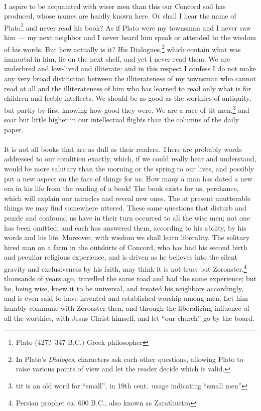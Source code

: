 \documentclass[letterpaper,12pt]{article}
\begin{document}
\paragraph{}
I aspire to be acquainted with wiser men than this our Concord soil has
produced, whose names are hardly known here. Or shall I hear the name of
Plato\footnote{Plato (427?--347 B.C.) Greek philosopher} and never read his
book? As if Plato were my townsman and I never saw him --- my next neighbor and
I never heard him speak or attended to the wisdom of his words. But how actually
is it? His Dialogues,\footnote{In Plato's \textit{Dialoges}, characters ask each
    other questions, allowing Plato to raise various points of view and let the
    reader decide which is valid.} which contain what was immortal in him, lie
on the next shelf, and yet I never read them. We are underbred and low-lived and
illiterate; and in this respect I confess I do not make any very broad
distinction between the illiterateness of my townsman who cannot read at all and
the illiterateness of him who has learned to read only what is for children and
feeble intellects. We should be as good as the worthies of antiquity, but partly
by first knowing how good they were. We are a race of tit-men,\footnote{tit is
    an old word for \enquote{small}, in 19th cent.\ usage indicating
    \enquote{small men}} and soar but little higher in our intellectual flights
than the columns of the daily paper.

\paragraph{}
It is not all books that are as dull as their readers. There are probably words
addressed to our condition exactly, which, if we could really hear and
understand, would be more salutary than the morning or the spring to our lives,
and possibly put a new aspect on the face of things for us. How many a man has
dated a new era in his life from the reading of a book! The book exists for us,
perchance, which will explain our miracles and reveal new ones. The at present
unutterable things we may find somewhere uttered. These same questions that
disturb and puzzle and confound us have in their turn occurred to all the wise
men; not one has been omitted; and each has answered them, according to his
ability, by his words and his life. Moreover, with wisdom we shall learn
liberality. The solitary hired man on a farm in the outskirts of Concord, who
has had his second birth and peculiar religious experience, and is driven as he
believes into the silent gravity and exclusiveness by his faith, may think it is
not true; but Zoroaster,\footnote{Persian prophet ca. 600 B.C., also known as
    Zarathustra} thousands of years ago, travelled the same road and had the
same experience; but he, being wise, knew it to be universal, and treated his
neighbors accordingly, and is even said to have invented and established worship
among men. Let him humbly commune with Zoroaster then, and through the
liberalizing influence of all the worthies, with Jesus Christ himself, and let
\enquote{our church} go by the board.
\end{document}
